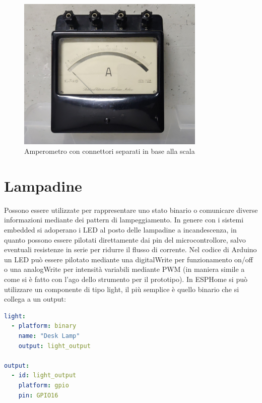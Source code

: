 \documentclass[12pt,a4paper]{report}
\begin{document}
\begin{figure}[h]
  \centering
  \includegraphics[width=0.8\textwidth]{connettorimultipli}
  \caption{Amperometro con connettori separati in base alla scala}
  \label{fig:connettorimultipli}
\end{figure}

\section{Lampadine}
Possono essere utilizzate per rappresentare uno stato binario o comunicare diverse informazioni mediante dei pattern di lampeggiamento.
In genere con i sistemi embedded si adoperano i LED al posto delle lampadine a incandescenza, in quanto possono essere pilotati
direttamente dai pin del microcontrollore, salvo eventuali resistenze in serie per ridurre il flusso di corrente.
Nel codice di Arduino un LED può essere pilotato mediante una digitalWrite per funzionamento on/off o una analogWrite per
intensità variabili mediante PWM (in maniera simile a come si è fatto con l'ago dello strumento per il prototipo).
In ESPHome si può utilizzare un componente di tipo light, il più semplice è quello binario che si collega a un output\cite{esphomeio}:
\begin{lstlisting}[language=yaml]
light:
  - platform: binary
    name: "Desk Lamp"
    output: light_output

output:
  - id: light_output
    platform: gpio
    pin: GPIO16
\end{lstlisting}
\end{document}
